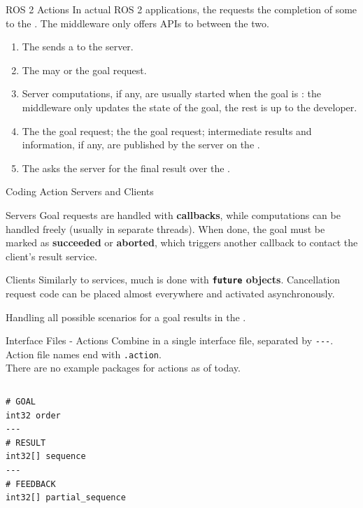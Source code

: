 \begin{frame}{ROS 2 Actions}
In actual ROS 2 applications, the  requests the completion of some  to the . The middleware only offers APIs to  between the two.
\begin{enumerate}
  \item The  sends a  to the server.
  \item The  may  or  the goal request.
  \item Server computations, if any, are usually started when the goal is : the middleware only updates the state of the goal, the rest is up to the developer.
  \item The  the goal request; the  the goal request; intermediate results and information, if any, are published by the server on the .
  \item The  asks the server for the final result over the .
\end{enumerate}
\end{frame}

\begin{frame}{Coding Action Servers and Clients}
\begin{block}{Servers}
Goal requests are handled with \textbf{callbacks}, while computations can be handled freely (usually in separate threads). When done, the goal must be marked as \textbf{succeeded} or \textbf{aborted}, which triggers another callback to contact the client's result service.
\end{block}
\begin{block}{Clients}
Similarly to services, much is done with \textbf{\texttt{future} objects}. Cancellation request code can be placed almost everywhere and activated asynchronously.
\end{block}
Handling all possible scenarios for a goal results in the . {\Large\smiley{}}
\end{frame}

\begin{frame}[fragile]{Interface Files - Actions}
Combine  in a single interface file, separated by \texttt{-{}-{}-}.\\
Action file names end with \texttt{.action}.\\
There are no example packages for actions as of today.
\begin{columns}
\begin{lstlisting}[language=ros2msg, caption=Definition of the \texttt{ros2\_examples\_interfaces/action/Fibonacci} action]
# GOAL
int32 order
---
# RESULT
int32[] sequence
---
# FEEDBACK
int32[] partial_sequence
\end{lstlisting}
\end{columns}
\end{frame}

